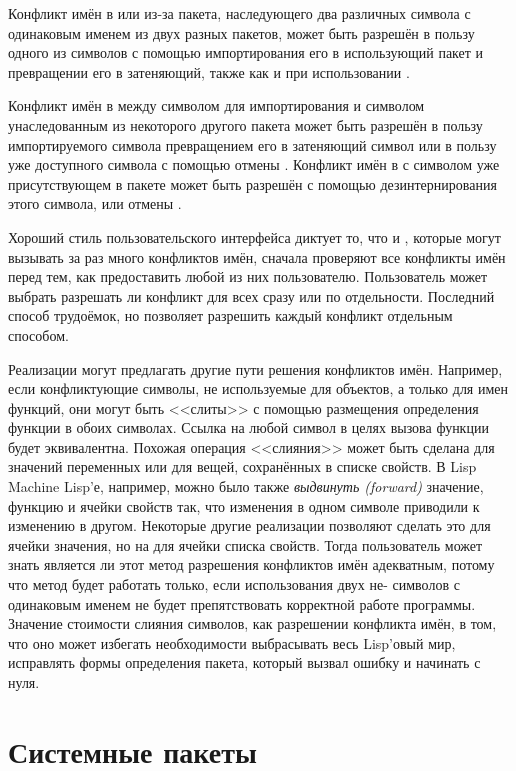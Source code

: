 Конфликт имён в  или  из-за пакета, наследующего два
различных символа с одинаковым именем из двух разных пакетов, может быть
разрешён в пользу одного из символов с помощью импортирования его в использующий
пакет и превращении его в затеняющий, также как и при использовании
.

Конфликт имён в  между символом для импортирования и символом
унаследованным из некоторого другого пакета может быть разрешён в пользу
импортируемого символа превращением его в затеняющий символ или в пользу уже
доступного символа с помощью отмены . Конфликт имён в  с
символом уже присутствующем в пакете может быть разрешён с помощью
дезинтернирования этого символа, или отмены .

Хороший стиль пользовательского интерфейса диктует то, что  и
, которые могут вызывать за раз много конфликтов имён, сначала
проверяют все конфликты имён перед тем, как предоставить любой из них
пользователю.
Пользователь может выбрать разрешать ли конфликт для всех сразу или по
отдельности. Последний способ трудоёмок, но позволяет разрешить каждый конфликт
отдельным способом.

Реализации могут предлагать другие пути решения конфликтов имён.
Например, если конфликтующие символы, не используемые для объектов, а только для
имен функций, они могут быть <<слиты>> с помощью размещения определения функции
в обоих символах. Ссылка на любой символ в целях вызова функции будет
эквивалентна. Похожая операция <<слияния>> может быть сделана для значений
переменных или для вещей, сохранённых в списке свойств. В Lisp Machine Lisp'е,
например, можно было также \emph{выдвинуть (forward)} значение, функцию и ячейки
свойств так, что изменения в одном символе приводили к изменению в
другом. Некоторые другие реализации позволяют сделать это для ячейки значения,
но на для ячейки списка свойств. Тогда пользователь может знать является ли этот
метод разрешения конфликтов имён адекватным, потому что метод будет работать
только, если использования двух не- символов с одинаковым именем не
будет препятствовать корректной работе программы. Значение стоимости слияния
символов, как разрешении конфликта имён, в том, что оно может избегать
необходимости выбрасывать весь Lisp'овый мир, исправлять формы определения
пакета, который вызвал ошибку и начинать с нуля.

\section{Системные пакеты}

